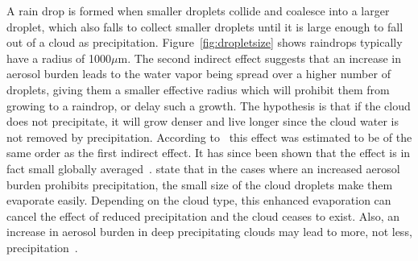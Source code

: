 A rain drop is formed when smaller droplets collide and coalesce into a larger droplet, which also falls to collect smaller droplets until it is large enough to fall out of a cloud as precipitation. Figure~\ref{fig:dropletsize} shows raindrops typically have a radius of 1000$\mu\text{m}$. The second indirect effect suggests that an increase in aerosol burden leads to the water vapor being spread over a higher number of droplets, giving them a smaller effective radius which will prohibit them from growing to a raindrop, or delay such a growth. The hypothesis is that if the cloud does not precipitate, it will grow denser and live longer since the cloud water is not removed by precipitation. According to~\citet{Lohmann2005} this effect was estimated to be of the same order as the first indirect effect. It has since been shown that the effect is in fact small globally averaged~\citep{Stevens2009}. \citet{Stevens2009} state that in the cases where an increased aerosol burden prohibits precipitation, the small size of the cloud droplets make them evaporate easily. Depending on the cloud type, this enhanced evaporation can cancel the effect of reduced precipitation and the cloud ceases to exist. Also, an increase in aerosol burden in deep precipitating clouds may lead to more, not less, precipitation~\citep{Stevens2008}.


